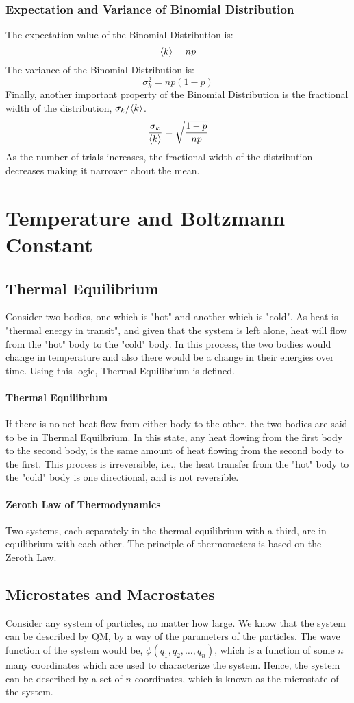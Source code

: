 \documentclass[12pt, oneside]{book}
\DeclarePairedDelimiter{\evdel}{\langle}{\rangle}
\newcommand{\ev}{\evdel}
\begin{document}
\subsubsection{Expectation and Variance of Binomial Distribution}
The expectation value of the Binomial Distribution is:
\[ \ev{k} = np \]
The variance of the Binomial Distribution is:
\[ \sigma_k^2 = np\left(1-p\right) \]
Finally, another important property of the Binomial Distribution is the fractional width of the distribution, \(\sigma_k/\ev{k}\).
\[ \frac{\sigma_k}{\ev{k}} = \sqrt{ \frac{1-p}{np} } \]
As the number of trials increases, the fractional width of the distribution decreases making it narrower about the mean.

\section{Temperature and Boltzmann Constant}
\subsection{Thermal Equilibrium}
Consider two bodies, one which is "hot" and another which is "cold".
As heat is "thermal energy in transit", and given that the system is left alone, heat will flow from the "hot" body to the "cold" body.
In this process, the two bodies would change in temperature and also there would be a change in their energies over time.
Using this logic, Thermal Equilibrium is defined.
\paragraph{Thermal Equilibrium} If there is no net heat flow from either body to the other, the two bodies are said to be in Thermal Equilbrium.
In this state, any heat flowing from the first body to the second body, is the same amount of heat flowing from the second body to the first.
This process is irreversible, i.e., the heat transfer from the "hot" body to the "cold" body is one directional, and is not reversible.
\paragraph{Zeroth Law of Thermodynamics} Two systems, each separately in the thermal equilibrium with a third, are in equilibrium with each other.
The principle of thermometers is based on the Zeroth Law.

\subsection{Microstates and Macrostates}
Consider any system of particles, no matter how large.
We know that the system can be described by QM, by a way of the parameters of the particles.
The wave function of the system would be, \(\phi(q_1, q_2, \dots, q_n)\), which is a function of some \(n\) many coordinates which are used to characterize the system.
Hence, the system can be described by a set of \(n\) coordinates, which is known as the microstate of the system.
\end{document}
